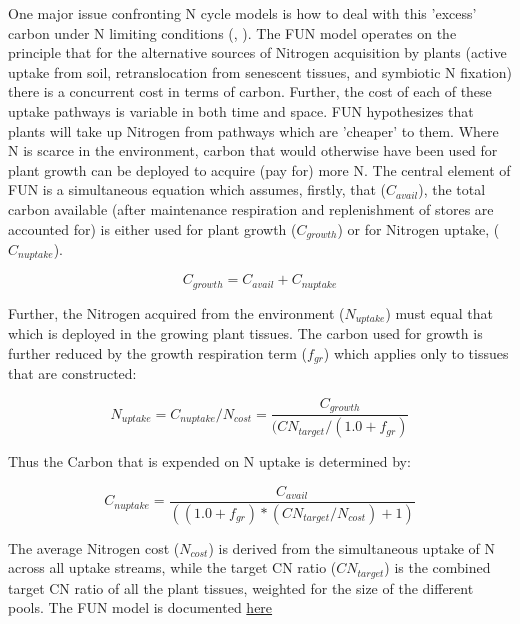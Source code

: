 \documentclass[draft,linenumbers]{agujournal}
\begin{document}
One major issue confronting N cycle models is how to deal with this 'excess' carbon under N limiting conditions (\cite{zaehle2010}, \cite{dekauwe2014}). The FUN model operates on the principle that for the alternative sources of Nitrogen acquisition by plants (active uptake from soil, retranslocation from senescent tissues, and symbiotic N fixation) there is a concurrent cost in terms of carbon. Further, the cost of each of these uptake pathways is variable in both time and space. FUN hypothesizes that plants will take up Nitrogen from pathways which are 'cheaper' to them. Where N is scarce in the environment, carbon that would otherwise have been used for plant growth can be deployed to acquire (pay for) more N. The central element of FUN is a simultaneous equation which assumes, firstly, that ($C_{avail}$), the total carbon available (after maintenance respiration and replenishment of stores are accounted for) is either used for plant growth ($C_{growth}$) or for Nitrogen uptake, ($C_{nuptake}$).


\begin{equation}
C_{growth}=C_{avail}+C_{nuptake}
\end{equation}


Further, the Nitrogen acquired from the environment ($N_{uptake}$) must equal that which is deployed in the growing plant tissues. The carbon used for growth is further reduced by the growth respiration term ($f_{gr}$) which applies only to tissues that are constructed:


\begin{equation}
N_{uptake}=C_{nuptake}/N_{cost} =\frac{C_{growth}}{(CN_{target}/(1.0+f_{gr})}
\end{equation}


Thus the Carbon that is expended on N uptake is determined by:

\begin{equation}
C_{nuptake} =\frac{C_{avail}}{ ( (1.0+f_{gr})*(CN_{target} / N_{cost}) + 1) }
\end{equation}


The average Nitrogen cost ($N_{cost}$) is derived from the simultaneous uptake of N across all uptake streams, while the target CN ratio ($CN_{target}$) is the combined target CN ratio of all the plant tissues, weighted for the size of the different pools. The FUN model is documented \href{https://escomp.github.io/ctsm-docs/doc/build/html/tech_note/FUN/CLM50_Tech_Note_FUN.html}{here}
\end{document}
